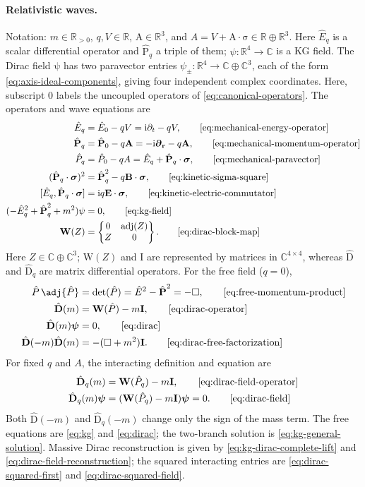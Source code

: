 \documentclass[11pt]{article}
\newcommand{\pv}[1]{{#1}}
\newcommand{\pvGreek}[1]{{#1}}
\newcommand{\vstyle}[1]{{\bm{\mathrm{#1}}}}
\newcommand{\pA}{\pv{A}}
\newcommand{\pP}{\pv{P}}
\newcommand{\pZ}{\pv{Z}}
\newcommand{\pvpsi}{\pvGreek{\psi}}
\numberwithin{equation}{section}
\newcommand{\R}{\mathbb{R}}
\newcommand{\C}{\mathbb{C}}
\newcommand{\ii}{\mathrm{i}}
\newcommand{\dotprod}{\cdot}
\newcommand{\bsig}{\vstyle{\sigma}}
\newcommand{\bA}{\vstyle{A}}
\newcommand{\br}{\vstyle{r}}
\newcommand{\bE}{\vstyle{E}}
\newcommand{\bBf}{\vstyle{B}}
\newcommand{\bp}{\vstyle{P}}
\newcommand{\bI}{\vstyle{I}}
\newcommand{\bpsi}{\vstyle{\psi}}
\newcommand{\hD}{\hat{\vstyle{D}}}
\newcommand{\hE}{\hat E}
\newcommand{\hbp}{\hat{\bp}}
\newcommand{\hP}{{\hat{\pP}}}
\newcommand{\hDq}{\hat{\vstyle{D}}_q}
\newcommand{\hEq}{\hat E_q}
\newcommand{\hbpq}{\hat{\bp}_q}
\newcommand{\hPq}{\hP_q}
\newcommand{\pdr}{\vstyle{\partial}_{\br}}
\newcommand{\Wop}{\vstyle{W}}
\begin{document}
\paragraph{Relativistic waves.}
Notation: $m\in\R_{>0}$, $q,V\in\R$, $\bA\in\R^3$, and
$\pA=V+\bA\dotprod\bsig\in\R\oplus\R^3$.
Here $\hEq$ is a scalar differential operator and $\hbpq$ a triple of them;
$\psi:\R^4\to\C$ is a KG field.
The Dirac field $\bpsi$ has two paravector entries
$\pvpsi_\pm:\R^4\to\C\oplus\C^3$, each of the form
\eqref{eq:axis-ideal-components}, giving four independent complex coordinates.
Here, subscript $0$ labels the uncoupled operators of
\eqref{eq:canonical-operators}. The operators and wave equations are
\begin{align*}
 \hEq&=\hE_0-qV=\ii\partial_t-qV,
   \tag*{\eqref{eq:mechanical-energy-operator}}\\
 \hbpq&=\hbp_0-q\bA=-\ii\pdr-q\bA,
   \tag*{\eqref{eq:mechanical-momentum-operator}}\\
 \hPq&=\hP_0-q\pA=\hEq+\hbpq\dotprod\bsig,
   \tag*{\eqref{eq:mechanical-paravector}}\\
 (\hbpq\dotprod\bsig)^2&=\hbpq^2-q\bBf\dotprod\bsig,
   \tag*{\eqref{eq:kinetic-sigma-square}}\\
 [\hEq,\hbpq\dotprod\bsig]&=\ii q\bE\dotprod\bsig,
   \tag*{\eqref{eq:kinetic-electric-commutator}}\\
 (-\hEq^2+\hbpq^2+m^2)\psi&=0,
   \tag*{\eqref{eq:kg-field}}\\
 \Wop(\pZ)&=\begin{Bmatrix}0&\operatorname{adj}(\pZ)\\\pZ&0\end{Bmatrix}.
   \tag*{\eqref{eq:dirac-block-map}}
\end{align*}
Here $\pZ\in\C\oplus\C^3$; $\Wop(\pZ)$ and $\bI$ are represented by
matrices in $\C^{4\times4}$, whereas $\hD$ and $\hDq$ are matrix
differential operators.
For the free field ($q=0$),
\begin{align*}
 \hP\,\adj\hP&=\det(\hP)=\hE^2-\hbp^2=-\Box,
   \tag*{\eqref{eq:free-momentum-product}}\\
 \hD(m)&=\Wop(\hP)-m\bI,
   \tag*{\eqref{eq:dirac-operator}}\\
 \hD(m)\bpsi&=0,
   \tag*{\eqref{eq:dirac}}\\
 \hD(-m)\hD(m)&=-(\Box+m^2)\bI.
   \tag*{\eqref{eq:dirac-free-factorization}}
\end{align*}
For fixed $q$ and $\pA$, the interacting definition and equation are
\begin{align*}
 \hDq(m)&=\Wop(\hPq)-m\bI,
   \tag*{\eqref{eq:dirac-field-operator}}\\
 \hDq(m)\bpsi&=(\Wop(\hPq)-m\bI)\bpsi=0.
   \tag*{\eqref{eq:dirac-field}}
\end{align*}
Both $\hD(-m)$ and $\hDq(-m)$ change only the sign of the mass term.
The free equations are \eqref{eq:kg} and \eqref{eq:dirac};
the two-branch solution is \eqref{eq:kg-general-solution}.
Massive Dirac reconstruction is given by \eqref{eq:kg-dirac-complete-lift}
and \eqref{eq:dirac-field-reconstruction}; the squared interacting entries
are \eqref{eq:dirac-squared-first} and \eqref{eq:dirac-squared-field}.
\end{document}
